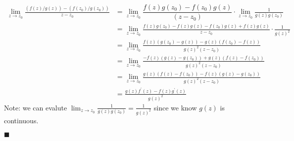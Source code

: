 \documentclass[12pt]{article}
\renewcommand{\qed}{\hfill$\blacksquare$}
\renewenvironment{proof}{\vspace{1em}\begin{addmargin}[2em]{0em}\begin{newproof}}{\end{newproof}\end{addmargin}\qed}
\begin{document}
\begin{proof}
	\begin{align*}
	\lim_{z \to z_0} \frac{(f(z)/g(z)) - (f(z_0)/g(z_0))}{z - z_0} &= \lim_{z \to z_0} \dfrac{f(z)g(z_0) - f(z_0)g(z)}{(z - z_0)} \cdot \lim_{z \to z_0} \frac{1}{g(z)g(z_0)} \\
												&= \lim_{z \to z_0} \frac{f(z)g(z_0) - f(z)g(z) - f(z_0)g(z) + f(z)g(z)}{z - z_0} \cdot \frac{1}{g(z)^2} \\
												&= \lim_{z \to z_0} \frac{f(z)(g(z_0) - g(z)) - g(z)(f(z_0) - f(z))}{g(z)^2(z - z_0)} \\
												&= \lim_{z \to z_0} \frac{-f(z)(g(z) - g(z_0)) + g(z)(f(z) - f(z_0))}{g(z)^2(z - z_0)} \\
												&= \lim_{z \to z_0}\frac{g(z)(f(z) - f(z_0)) - f(z)(g(z) - g(z_0))}{g(z)^2(z - z_0)} \\
												&= \frac{g(z)f^{'}(z) - f(z)g^{'}(z)}{g(z)^2}
	\end{align*}	
	Note: we can evalute $\lim_{z\to z_0} \frac{1}{g(z)g(z_0)} = \frac{1}{g(z)^2}$ since we know $g(z)$ is continuous. 
\end{proof}
\end{document}
